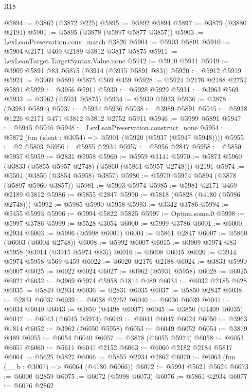 \begin{lexlean}{R18}
\begin{coremodule}
@5894 := @3862 (@3872 @225)
@5895 := @5892 @5894
@5897 := @3879 (@3880 @2191)
@5901 := @5895 (@3878 (@5897 @5877 @3857))
@5903 := LexLeanPreservation.conv_match @3826
@5904 := @5903 @5891
@5910 := @5904 @2171 @469 @2189 @3812 @3817 @5875
@5911 := LexLeanTarget.TargetSyntax.Value.none
@5912 := @5910 @5911
@5919 := @3909 @5891 @83 @5875 (@3914 (@3915 @5891 @83))
@5920 := @5912 @5919
@5924 := @3969 @5891 @5875 @569 @459
@5928 := @5924 @2176 @2188 @2752 @5891
@5929 := @3956 @5911
@5930 := @5928 @5929
@5931 := @3963 @569
@5933 := @3962 (@5931 @5875)
@5934 := @5930 @5933
@5936 := @3878 (@3984 @5891)
@5937 := @5934 @5936
@5938 := @3989 @5891
@5945 := @5938 @1226 @2171 @471 @3812 @3812 @2752 @5911
@5946 := @3999 @5891
@5947 := @5945 @5946
@5948 := LexLeanPreservation.construct_none
@5954 := @5872 (fun (ident : @3054) => @5901 (@5920 (@5937 (@5947 @5948))))
@5955 := @2 @5803
@5956 := @5955 @2934
@5957 := @5956 @2847
@5958 := @5850 @5957
@5959 := @2831 @5958
@5960 := @5959 @3141
@5970 := @5873 @5960 (@3833 (@5855 @5957 @2748) (@5860 (@5861 @5957 @2748))) @2191
@5974 := @5501 (@3850 (@3854 @5958) @3857)
@5980 := @5970 @5974 @5894 (@3878 (@5897 @5960 @3857))
@5981 := @5903 @5974
@5985 := @5981 @2171 @469 @2189 @3812
@5986 := @5855 @2847
@5990 := @5818 (@5828 (@4180 (@5986 @2748)))
@5992 := @5985 @5990 @5958
@5993 := @3342 @3786
@5994 := @5455 @5993
@5996 := @5994 @5822 @5825
@5997 := Option.some.{0}
@5998 := @5997 @3786
@5999 := @5528 @3054
@6000 := @5999 @3786
@6001 := @6000 @2934
@6003 := @5996 (@5998 @6001)
@6004 := @5861 @2847
@6007 := @5860 (@6003 (@6004 @2748))
@6008 := @5992 @6007
@6015 := @3909 @5974 @83 @5958 (@3914 (@3915 @5974 @83))
@6016 := @6008 @6015
@6020 := @3944 @5974 @5958 @569 @459
@6022 := @6020 @2176 @2188
@6024 := @3833 @5990 @6007
@6025 := @6022 @6024
@6027 := @3962 (@5931 @5958)
@6028 := @6025 @6027
@6032 := @3969 @5974 @5958 @1814 @489
@6034 := @6032 @2185 @628
@6035 := @5849 @2934
@6036 := @2831 @6035
@6037 := @5850 @2847
@6038 := @2831 @6037
@6039 := @6038 @2752
@6040 := @6036 @6039
@6041 := @6034 @6040
@6043 := @3850 (@4498 @6037)
@6045 := @3850 (@4409 @6035)
@6047 := @6043 (@6045 @5974)
@6049 := @6041 @6047 @6024
@6050 := @3963 @1814
@6052 := @3962 (@6050 @5958)
@6053 := @6049 @6052
@6054 := @3879 @489
@6055 := @6054 @6040
@6057 := @3878 (@6055 @5974)
@6058 := @6053 @6057
@6060 := @5611 @6047 @2152
@6063 := @6060 @2182 @2184 @5817
@6064 := @5625 @5827
@6066 := @5855 @2934 @2862
@6070 := @6063 (fun (__b : @3007) => @6064 (@4180 @6066))
@6072 := @5994 @5621 @5624
@6073 := @6000 @2859
@6075 := @6072 (@5998 @6073)
@6076 := @5861 @2934
@6077 := @6076 @2862

\end{coremodule}
\end{lexlean}
